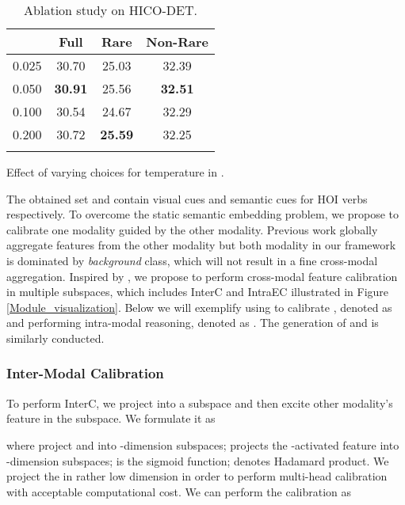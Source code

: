 \documentclass[letterpaper]{article} \usepackage{aaai22}  \usepackage{times}  \usepackage{helvet}  \usepackage{courier}  \usepackage[hyphens]{url}  \usepackage{graphicx} \urlstyle{rm} \def\UrlFont{\rm}  \usepackage{natbib}  \usepackage{caption} \DeclareCaptionStyle{ruled}{labelfont=normalfont,labelsep=colon,strut=off} \frenchspacing  \setlength{\pdfpagewidth}{8.5in}  \setlength{\pdfpageheight}{11in}  \usepackage{algorithm}
\begin{document}
\begin{table*}[t]
     \hfill
    \begin{subtable}[t]{0.25\textwidth}
          \small
          \setlength{\tabcolsep}{2pt}
          \centering
            \begin{tabular}{c|ccc}
            \Xhline{1.0pt}
            \textbf{}  & \textbf{Full} & \textbf{Rare} & {\footnotesize \textbf{Non-Rare}} \\
            \hline
            \hline
            0.025  & 30.70  & 25.03  & 32.39  \\
            0.050  & \textbf{30.91} & 25.56 & \textbf{32.51} \\
            0.100  & 30.54  & 24.67  & 32.29  \\
            0.200  & 30.72  & \textbf{25.59}  & 32.25  \\
            \Xhline{1.0pt}
            \end{tabular}\caption{Effect of varying choices for temperature  in .}
          \label{Ablation_tau}\end{subtable}
     \caption{Ablation study on HICO-DET.}
     \label{Ablation}
\end{table*}



The obtained set  and  contain visual cues and semantic cues for HOI verbs respectively. To overcome the static semantic embedding problem, we propose to calibrate one modality guided by the other modality. Previous work globally aggregate features from the other modality \cite{Gao2019DynamicInterIntra} but both modality in our framework is dominated by \textit{background} class, which will not result in a fine cross-modal aggregation. Inspired by \cite{hu2018SENet,AttentionAlluNeed}, we propose to perform cross-modal feature calibration in multiple subspaces, which includes InterC and IntraEC illustrated in Figure \ref{Module_visualization}. Below we will exemplify using  to calibrate , denoted as  and performing intra-modal reasoning, denoted as . The generation of  and  is similarly conducted.


\subsubsection{Inter-Modal Calibration} To perform InterC, we project  into a subspace and then excite other modality's feature  in the subspace. We formulate it as 

where  project  and  into -dimension subspaces;  projects the -activated feature into -dimension subspaces;  is the sigmoid function;  denotes Hadamard product. We project the  in rather low dimension in order to perform multi-head calibration with acceptable computational cost. We can perform the calibration as
\end{document}
